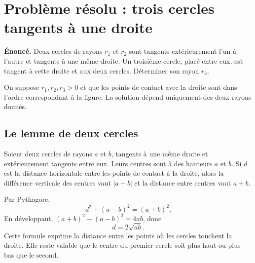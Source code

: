 \section{Problème résolu : trois cercles tangents à une droite}
\textbf{Énoncé.} Deux cercles de rayons $r_1$ et $r_2$ sont tangents extérieurement l'un à l'autre et tangents à une même droite. Un troisième cercle, placé entre eux, est tangent à cette droite et aux deux cercles. Déterminer son rayon $r_3$.

On suppose $r_1,r_2,r_3>0$ et que les points de contact avec la droite sont dans l'ordre correspondant à la figure. La solution dépend uniquement des deux rayons donnés.

\begin{center}
\end{center}

\subsection{Le lemme de deux cercles}
Soient deux cercles de rayons $a$ et $b$, tangents à une même droite et extérieurement tangents entre eux. Leurs centres sont à des hauteurs $a$ et $b$. Si $d$ est la distance horizontale entre les points de contact à la droite, alors la différence verticale des centres vaut $|a-b|$ et la distance entre centres vaut $a+b$.

Par Pythagore,
\[
 d^2+(a-b)^2=(a+b)^2.
\]
En développant, $(a+b)^2-(a-b)^2=4ab$, donc
\begin{equation}\label{eq:gap}
 d=2\sqrt{ab}.
\end{equation}
Cette formule exprime la distance entre les points où les cercles touchent la droite. Elle reste valable que le centre du premier cercle soit plus haut ou plus bas que le second.

